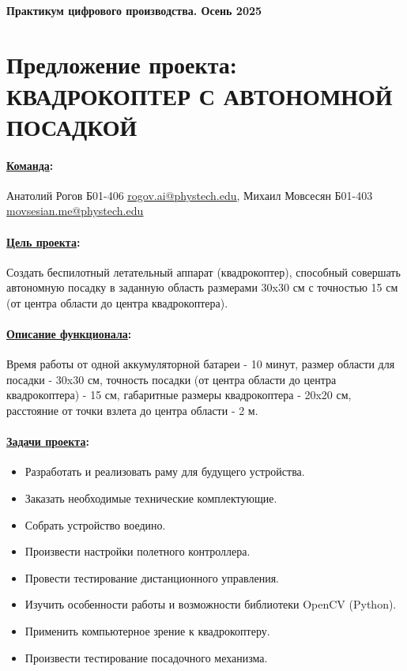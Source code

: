 \documentclass[a4paper,12pt]{article} %
\begin{document}
\paragraph{Практикум цифрового производства. Осень 2025}
\section*{Предложение проекта: \newline КВАДРОКОПТЕР С АВТОНОМНОЙ ПОСАДКОЙ}

\paragraph{\underline{Команда}:}
Анатолий Рогов Б01-406 \href{mailto:rogov.ai@phystech.edu}{\underline{rogov.ai@phystech.edu}}, Михаил Мовсесян Б01-403 \href{mailto:movsesian.me@phystech.edu}{\underline{movsesian.me@phystech.edu}}

\paragraph{\underline{Цель проекта}:}
Создать беспилотный летательный аппарат (квадрокоптер), способный совершать автономную посадку в заданную область размерами 30x30 см с точностью 15 см (от центра области до центра квадрокоптера).

\paragraph{\underline{Описание функционала}:}
Время работы от одной аккумуляторной батареи - 10 минут, размер области для посадки - 30x30 см, точность посадки (от центра области до центра квадрокоптера) - 15 см, габаритные размеры квадрокоптера - 20x20 см, расстояние от точки взлета до центра области - 2 м.

\paragraph{\underline{Задачи проекта}:}
\begin{itemize}
    \item Разработать и реализовать раму для будущего устройства.
    \item Заказать необходимые технические комплектующие.
    \item Собрать устройство воедино.
    \item Произвести настройки полетного контроллера.
    \item Провести тестирование дистанционного управления.
    \item Изучить особенности работы и возможности библиотеки OpenCV (Python).
    \item Применить компьютерное зрение к квадрокоптеру.
    \item Произвести тестирование посадочного механизма.
\end{itemize}
\end{document}
